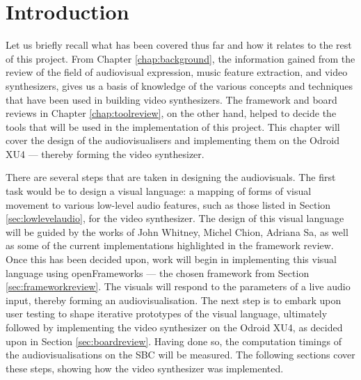 \documentclass[../initial_thesis.tex]{subfiles}
\begin{document}
\section{Introduction}


Let us briefly recall what has been covered thus far and how it relates to the rest of this project. From Chapter \ref{chap:background}, the information gained from the review of the field of audiovisual expression, music feature extraction, and video synthesizers, gives us a basis of knowledge of the various concepts and techniques that have been used in building video synthesizers. The framework and board reviews in Chapter \ref{chap:toolreview}, on the other hand, helped to decide the tools that will be used in the implementation of this project. This chapter will cover the design of the audiovisualisers and implementing them on the Odroid XU4 --- thereby forming the video synthesizer. \par

There are several steps that are taken in designing the audiovisuals. The first task would be to design a visual language: a mapping of forms of visual movement to various low-level audio features, such as those listed in Section \ref{sec:lowlevelaudio}, for the video synthesizer. The design of this visual language will be guided by the works of John Whitney, Michel Chion, Adriana Sa, as well as some of the current implementations highlighted in the framework review. Once this has been decided upon, work will begin in implementing this visual language using openFrameworks --- the chosen framework from Section \ref{sec:frameworkreview}. The visuals will respond to the parameters of a live audio input, thereby forming an audiovisualisation. The next step is to embark upon user testing to shape iterative prototypes of the visual language, ultimately followed by implementing the video synthesizer on the Odroid XU4, as decided upon in Section \ref{sec:boardreview}. Having done so, the computation timings of the audiovisualisations on the SBC will be measured. The following sections cover these steps, showing how the video synthesizer was implemented.
\end{document}
